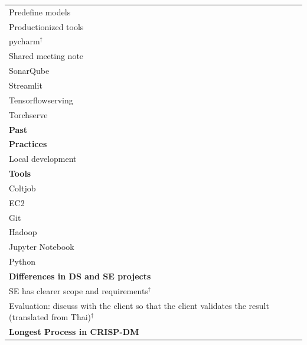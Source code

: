 \documentclass[11pt]{article}
\begin{document}
\begin{longtable}{@{}p{15cm}@{}}
\hspace*{4.5em}Predefine models \\
\hspace*{4.5em}Productionized tools \\
\hspace*{4.5em}pycharm$^\dagger$ \\
\hspace*{4.5em}Shared meeting note \\
\hspace*{4.5em}SonarQube \\
\hspace*{4.5em}Streamlit \\
\hspace*{4.5em}Tensorflowserving \\
\hspace*{4.5em}Torchserve \\
\hspace*{1.5em}\textbf{Past} \\
\hspace*{3.0em}\textbf{Practices} \\
\hspace*{4.5em}Local development \\
\hspace*{3.0em}\textbf{Tools} \\
\hspace*{4.5em}Coltjob \\
\hspace*{4.5em}EC2 \\
\hspace*{4.5em}Git \\
\hspace*{4.5em}Hadoop \\
\hspace*{4.5em}Jupyter Notebook \\
\hspace*{4.5em}Python \\
\hspace*{0.0em}\textbf{Differences in DS and SE projects} \\
\hspace*{1.5em}SE has clearer scope and requirements$^\dagger$ \\
\hspace*{0.0em}Evaluation: discuss with the client so that the client validates the result (translated from Thai)$^\dagger$ \\
\hspace*{0.0em}\textbf{Longest Process in CRISP-DM} \\

\end{longtable}
\end{document}
